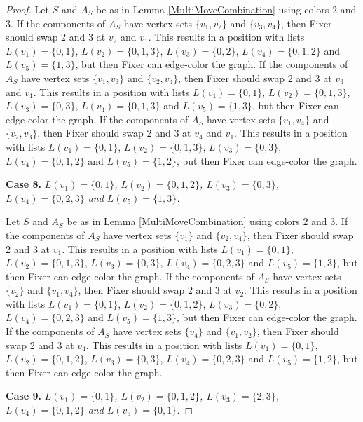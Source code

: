 \documentclass[12pt]{amsart}
\theoremstyle{plain}
\theoremstyle{definition}
\theoremstyle{remark}
\begin{document}
\begin{proof}
Let $S$ and $A_S$ be as in Lemma \ref{MultiMoveCombination} using colors $2$ and $3$. If the components of $A_S$ have vertex sets $\{v_1, v_2\}$ and $\{v_3, v_4\}$, then Fixer should swap 2 and 3 at $v_2$ and $v_1$. This results in a position with lists $L(v_1) = \{0, 1\}$, $L(v_2) = \{0, 1, 3\}$, $L(v_3) = \{0, 2\}$, $L(v_4) = \{0, 1, 2\}$ and $L(v_5) = \{1, 3\}$, but then Fixer can edge-color the graph.
If the components of $A_S$ have vertex sets $\{v_1, v_3\}$ and $\{v_2, v_4\}$, then Fixer should swap 2 and 3 at $v_3$ and $v_1$. This results in a position with lists $L(v_1) = \{0, 1\}$, $L(v_2) = \{0, 1, 3\}$, $L(v_3) = \{0, 3\}$, $L(v_4) = \{0, 1, 3\}$ and $L(v_5) = \{1, 3\}$, but then Fixer can edge-color the graph.
If the components of $A_S$ have vertex sets $\{v_1, v_4\}$ and $\{v_2, v_3\}$, then Fixer should swap 2 and 3 at $v_4$ and $v_1$. This results in a position with lists $L(v_1) = \{0, 1\}$, $L(v_2) = \{0, 1, 3\}$, $L(v_3) = \{0, 3\}$, $L(v_4) = \{0, 1, 2\}$ and $L(v_5) = \{1, 2\}$, but then Fixer can edge-color the graph.

\noindent\textbf{Case 8.  }\textit{$L(v_1) = \{0, 1\}$, $L(v_2) = \{0, 1, 2\}$, $L(v_3) = \{0, 3\}$, $L(v_4) = \{0, 2, 3\}$ and $L(v_5) = \{1, 3\}$.}

Let $S$ and $A_S$ be as in Lemma \ref{MultiMoveCombination} using colors $2$ and $3$. If the components of $A_S$ have vertex sets $\{v_1\}$ and $\{v_2, v_4\}$, then Fixer should swap 2 and 3 at $v_1$. This results in a position with lists $L(v_1) = \{0, 1\}$, $L(v_2) = \{0, 1, 3\}$, $L(v_3) = \{0, 3\}$, $L(v_4) = \{0, 2, 3\}$ and $L(v_5) = \{1, 3\}$, but then Fixer can edge-color the graph.
If the components of $A_S$ have vertex sets $\{v_2\}$ and $\{v_1, v_4\}$, then Fixer should swap 2 and 3 at $v_2$. This results in a position with lists $L(v_1) = \{0, 1\}$, $L(v_2) = \{0, 1, 2\}$, $L(v_3) = \{0, 2\}$, $L(v_4) = \{0, 2, 3\}$ and $L(v_5) = \{1, 3\}$, but then Fixer can edge-color the graph.
If the components of $A_S$ have vertex sets $\{v_4\}$ and $\{v_1, v_2\}$, then Fixer should swap 2 and 3 at $v_4$. This results in a position with lists $L(v_1) = \{0, 1\}$, $L(v_2) = \{0, 1, 2\}$, $L(v_3) = \{0, 3\}$, $L(v_4) = \{0, 2, 3\}$ and $L(v_5) = \{1, 2\}$, but then Fixer can edge-color the graph.

\noindent\textbf{Case 9.  }\textit{$L(v_1) = \{0, 1\}$, $L(v_2) = \{0, 1, 2\}$, $L(v_3) = \{2, 3\}$, $L(v_4) = \{0, 1, 2\}$ and $L(v_5) = \{0, 1\}$.}


\end{proof}
\end{document}

